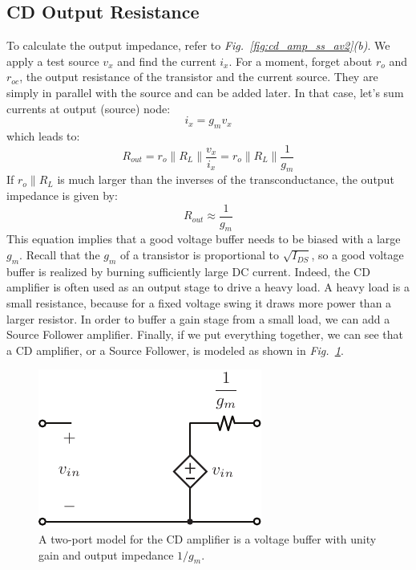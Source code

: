 \subsection{CD Output Resistance}
To calculate the output impedance, refer to \emph{Fig.~\ref{fig:cd_amp_ss_av2}(b)}.  We apply a test source $v_x$ and find the current $i_x$.  For a moment, forget about $r_o$ and $r_{oc}$, the output resistance of the transistor and the current source.  They are simply in parallel with the source and can be added later.  In that case, let's sum currents at output (source) node:
    \begin{equation}
        {i_x} = {g_m}{v_x}
    \end{equation}
which leads to:
    \begin{equation}
        {R_{out}} = {r_o} \parallel {R_L} \parallel \frac{{{v_x}}}{{{i_x}}} = {r_o} \parallel {R_L} \parallel \frac{1}{g_m}
    \end{equation}
If $r_o \parallel R_L$ is much larger than the inverses of the transconductance, the output impedance is given by:
    \begin{equation}
        {R_{out}} \approx \frac{1}{{{g_m}}}
    \end{equation}
This equation implies that a good voltage buffer needs to be biased with a large $g_m$.  Recall that the $g_m$ of a transistor is proportional to $\sqrt{I_{DS}}$, so a good voltage buffer is realized by burning sufficiently large DC current.  Indeed, the CD amplifier is often used as an output stage to drive a heavy load.  A heavy load is a small resistance, because for a fixed voltage swing it draws more power than a larger resistor.  In order to buffer a gain stage from a small load, we can add a Source Follower amplifier.
Finally, if we put everything together, we can see that a CD amplifier, or a Source Follower, is modeled as shown in \emph{Fig.~\ref{fig:cd_amp_model}}.  
\begin{figure}[tb]
\centering
\includegraphics[scale=1]{cd_amp_model}
\caption{A two-port model for the CD amplifier is a voltage buffer with unity gain and output impedance $1/g_m$.}
\label{fig:cd_amp_model}
\end{figure}
